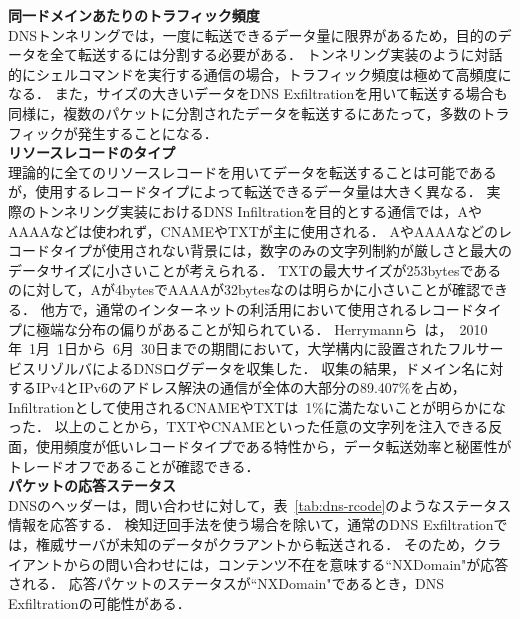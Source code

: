 \hspace{-12pt}\textbf{同一ドメインあたりのトラフィック頻度}\\
\hspace{12pt}DNSトンネリングでは，一度に転送できるデータ量に限界があるため，目的のデータを全て転送するには分割する必要がある．
トンネリング実装のように対話的にシェルコマンドを実行する通信の場合，トラフィック頻度は極めて高頻度になる．
また，サイズの大きいデータをDNS Exfiltrationを用いて転送する場合も同様に，複数のパケットに分割されたデータを転送するにあたって，多数のトラフィックが発生することになる．\\

\hspace{-12pt}\textbf{リソースレコードのタイプ}\\
\hspace{12pt}理論的に全てのリソースレコードを用いてデータを転送することは可能であるが，使用するレコードタイプによって転送できるデータ量は大きく異なる．
実際のトンネリング実装におけるDNS Infiltrationを目的とする通信では，AやAAAAなどは使われず，CNAMEやTXTが主に使用される．
AやAAAAなどのレコードタイプが使用されない背景には，数字のみの文字列制約が厳しさと最大のデータサイズに小さいことが考えられる．
TXTの最大サイズが253bytesであるのに対して，Aが4bytesでAAAAが32bytesなのは明らかに小さいことが確認できる．
他方で，通常のインターネットの利活用において使用されるレコードタイプに極端な分布の偏りがあることが知られている．
 Herrymannら~\cite{Herrymann}は，~2010年~1月~1日から~6月~30日までの期間において，大学構内に設置されたフルサービスリゾルバによるDNSログデータを収集した．
 収集の結果，ドメイン名に対するIPv4とIPv6のアドレス解決の通信が全体の大部分の89.407\%を占め，Infiltrationとして使用されるCNAMEやTXTは~1\%に満たないことが明らかになった．
 以上のことから，TXTやCNAMEといった任意の文字列を注入できる反面，使用頻度が低いレコードタイプである特性から，データ転送効率と秘匿性がトレードオフであることが確認できる．\\

 \hspace{-12pt}\textbf{パケットの応答ステータス}\\
 \hspace{12pt}DNSのヘッダーは，問い合わせに対して，表~\ref{tab:dns-rcode}のようなステータス情報を応答する．
 検知迂回手法を使う場合を除いて，通常のDNS Exfiltrationでは，権威サーバが未知のデータがクラアントから転送される．
そのため，クライアントからの問い合わせには，コンテンツ不在を意味する``NXDomain"が応答される．
応答パケットのステータスが``NXDomain"であるとき，DNS Exfiltrationの可能性がある．
%


